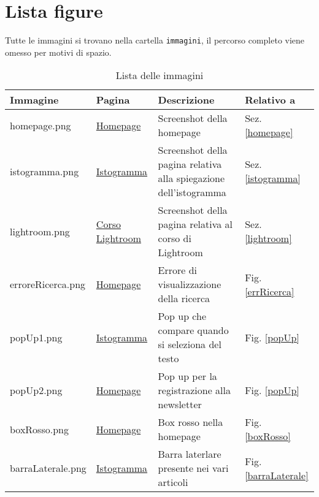\section{Lista figure}\label{immagini}
Tutte le immagini si trovano nella cartella \texttt{immagini}, il percorso completo viene omesso per motivi di spazio.


\small
\begin{table}[ht]
\begin{center}
\begin{tabular}{|l|p{2.5cm}|p{5cm}|l|}
\hline 
\textbf{Immagine} & \textbf{Pagina} & \textbf{Descrizione} & \textbf{Relativo a}\\ \hline 
homepage.png & \href{http://www.fotocomefare.com}{Homepage} & Screenshot della homepage & Sez. \ref{homepage}  \\ \hline
istogramma.png & \href{http://www.fotocomefare.com/istogramma-esposizione-corretta/}{Istogramma} & Screenshot della pagina relativa alla spiegazione dell'istogramma & Sez. \ref{istogramma} \\ \hline
lightroom.png & \href{http://www.fotocomefare.com/corso-completo-lightroom-5/}{Corso Lightroom} & Screenshot della pagina relativa al corso di Lightroom & Sez. \ref{lightroom} \\ \hline
erroreRicerca.png & \href{http://www.fotocomefare.com}{Homepage} & Errore di visualizzazione della ricerca & Fig. \ref{errRicerca} \\ \hline
popUp1.png & \href{http://www.fotocomefare.com/istogramma-esposizione-corretta/}{Istogramma} & Pop up che compare quando si seleziona del testo & Fig. \ref{popUp} \\ \hline
popUp2.png & \href{http://www.fotocomefare.com}{Homepage} & Pop up per la registrazione alla newsletter & Fig. \ref{popUp} \\ \hline
boxRosso.png & \href{http://www.fotocomefare.com}{Homepage} & Box rosso nella homepage & Fig. \ref{boxRosso} \\ \hline
barraLaterale.png & \href{http://www.fotocomefare.com/istogramma-esposizione-corretta/}{Istogramma} & Barra laterlare presente nei vari articoli & Fig. \ref{barraLaterale} \\ \hline

\end{tabular}
\caption{Lista delle immagini}\label{tabella:listaFigure}
\end{center}
\end{table}

